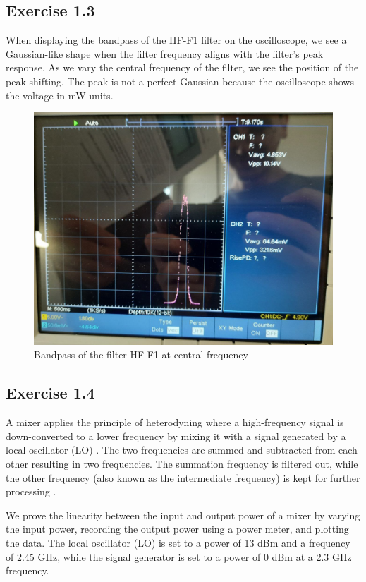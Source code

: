\documentclass[12pt]{article}
\begin{document}
\subsection{Exercise 1.3}

When displaying the bandpass of the HF-F1 filter on the oscilloscope, we see a Gaussian-like shape when the filter frequency aligns with the filter's peak response. As we vary the central frequency of the filter, we see the position of the peak shifting. The peak is not a perfect Gaussian because the oscilloscope shows the voltage in mW units. 

 \begin{figure}[H]
\centering
\includegraphics[scale=.2]{fig/Exercise 1.3.jpg}
\caption{Bandpass of the filter HF-F1 at central frequency }
\label{fig1.3}
\end{figure}

\subsection{Exercise 1.4}


A mixer applies the principle of heterodyning where a high-frequency signal is down-converted to a lower frequency by mixing it with a signal generated by a local oscillator (LO) \cite{klein}. The two frequencies are summed and subtracted from each other resulting in two frequencies. The summation frequency is filtered out, while the other frequency (also known as the intermediate frequency) is kept for further processing \cite{klein}. 

We prove the linearity between the input and output power of a mixer by varying the input power, recording the output power using a power meter, and plotting the data. The local oscillator (LO) is set to a power of 13 dBm and a frequency of 2.45 GHz, while the signal generator is set to a power of 0 dBm at a 2.3 GHz frequency.
\end{document}
